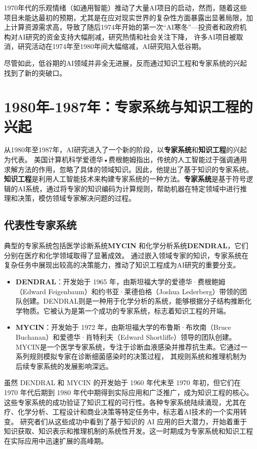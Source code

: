1970年代的乐观情绪（如通用智能）推动了大量AI项目的启动，然而，随着这些项目未能达最初的预期，尤其是在应对现实世界的复杂性方面暴露出显著局限，加上计算资源需求高，导致了随后1974年开始的第一次“AI寒冬”---投资者和政府机构对AI研究的资金支持大幅削减，研究热情和社会关注下降， 许多AI项目被取消，研究活动在1974年至1980年间大幅缩减，AI研究陷入低谷期。

尽管如此，低谷期的AI领域并非全无进展，反而通过知识工程和专家系统的兴起找到了新的突破口。

\section{1980年-1987年：专家系统与知识工程的兴起} 
从1980年至1987年，AI研究进入了一个新的阶段，以{\bf 专家系统}和{\bf 知识工程}的兴起为代表。
美国计算机科学爱德华•费根鲍姆指出，传统的人工智能过于强调通用求解方法的作用，忽略了具体的领域知识。因此，他提出了基于知识的专家系统。
{\bf 知识工程}是利用人工智能技术来构建专家系统的一种方法。{\bf 专家系统}是基于符号逻辑的AI系统，通过将专家的知识编码为计算规则，帮助机器在特定领域中进行推理和决策，模仿领域专家解决问题的过程。 

\subsection{代表性专家系统}

典型的专家系统包括医学诊断系统{\bf MYCIN} 和化学分析系统{\bf DENDRAL}，它们分别在医疗和化学领域取得了显著成效。
通过嵌入领域专家的知识，专家系统在复杂任务中展现出较高的决策能力，推动了知识工程成为AI研究的重要分支。

\begin{itemize}
\item {\bf DENDRAL}：开发始于 1965 年，由斯坦福大学的爱德华·费根鲍姆（Edward Feigenbaum）和约书亚·莱德伯格（Joshua Lederberg）带领的团队创建。DENDRAL则是一种用于化学分析的系统，能够根据分子结构推断化学物质。它被认为是第一个成功的专家系统，标志着知识工程的开端。

\item {\bf MYCIN}：开发始于 1972 年，由斯坦福大学的布鲁斯·布坎南（Bruce Buchanan）和爱德华·肖特利夫（Edward Shortliffe）领导的团队创建。MYCIN是一个医学专家系统，专注于诊断血液感染并推荐抗生素。它通过一系列规则模拟专家在诊断细菌感染时的决策过程， 其规则系统和推理机制为后续专家系统的发展影响深远。 
\end{itemize}

虽然 DENDRAL 和 MYCIN 的开发始于 1960 年代末至 1970 年初，但它们在 1970 年代后期到 1980 年代中期得到实际应用和广泛推广，成为知识工程的核心。
这些专家系统的成功验证了知识工程的可行性。各种专家系统陆续涌现，尤其在疗、化学分析、工程设计和商业决策等特定任务中，标志着AI技术的一个实用转变。
研究者们从这些成功中看到了基于知识的 AI 应用的巨大潜力，开始着重于知识获取、知识表示和推理机制的系统性开发。这一时期成为专家系统和知识工程在实际应用中迅速扩展的高峰期。

